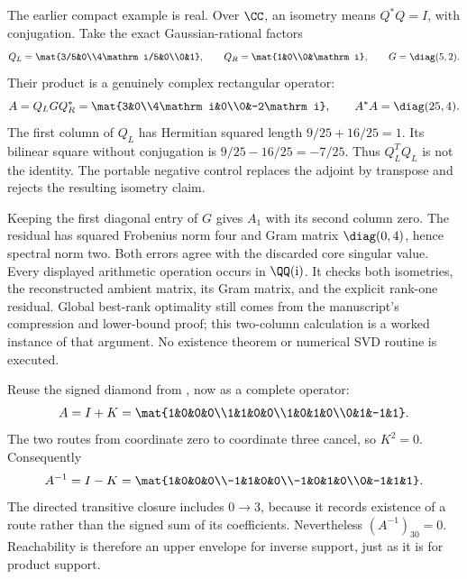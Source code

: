 The earlier compact example is real. Over $\CC$, an isometry means $Q^*Q=I$, with conjugation. Take the exact Gaussian-rational factors
\[
Q_L=\mat{3/5&0\\4\mathrm i/5&0\\0&1},\qquad
Q_R=\mat{1&0\\0&\mathrm i},\qquad G=\diag(5,2).
\]
Their product is a genuinely complex rectangular operator:
\[
A=Q_LGQ_R^*=\mat{3&0\\4\mathrm i&0\\0&-2\mathrm i},
\qquad A^*A=\diag(25,4).
\]
The first column of $Q_L$ has Hermitian squared length $9/25+16/25=1$. Its bilinear square without conjugation is $9/25-16/25=-7/25$. Thus $Q_L^TQ_L$ is not the identity. The portable negative control replaces the adjoint by transpose and rejects the resulting isometry claim.

Keeping the first diagonal entry of $G$ gives $A_1$ with its second column zero. The residual has squared Frobenius norm four and Gram matrix $\diag(0,4)$, hence spectral norm two. Both errors agree with the discarded core singular value. Every displayed arithmetic operation occurs in $\QQ(\mathrm i)$.
It checks both isometries, the reconstructed ambient matrix, its Gram matrix, and the explicit rank-one residual. Global best-rank optimality still comes from the manuscript's compression and lower-bound proof; this two-column calculation is a worked instance of that argument. No existence theorem or numerical SVD routine is executed.

Reuse the signed diamond from , now as a complete operator:
\[
A=I+K=\mat{1&0&0&0\\1&1&0&0\\1&0&1&0\\0&1&-1&1}.
\]
The two routes from coordinate zero to coordinate three cancel, so $K^2=0$. Consequently
\[
A^{-1}=I-K=\mat{1&0&0&0\\-1&1&0&0\\-1&0&1&0\\0&-1&1&1}.
\]
The directed transitive closure includes $0\to3$, because it records existence of a route rather than the signed sum of its coefficients. Nevertheless $(A^{-1})_{30}=0$. Reachability is therefore an upper envelope for inverse support, just as it is for product support.

